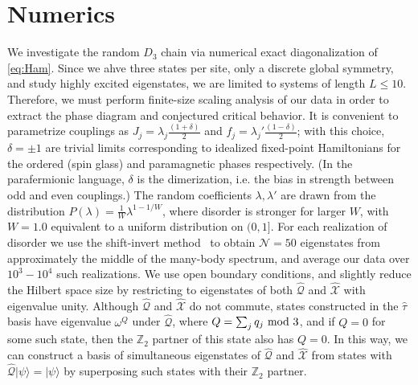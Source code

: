 \documentclass[prb,aps, twocolumn, superscriptaddress]{revtex4-1}
\def\ket#1{{|#1\rangle}}
\begin{document}
\section{Numerics} We investigate the random $D_3$ chain via numerical exact diagonalization of \eqref{eq:Ham}. Since we ahve three states per site, only a discrete global symmetry, and study highly excited eigenstates, we are limited to systems of length $L\leq 10$. Therefore, we must perform  finite-size scaling analysis of our data in order to extract the phase diagram and conjectured critical behavior.  It is convenient to parametrize couplings as $J_j = {\lambda_j}\frac{(1 + \delta)}{2}$ and $f_j = {\lambda_j'}\frac{(1 - \delta)}{2}$; with this choice, $\delta=\pm1$ are trivial limits corresponding to idealized fixed-point Hamiltonians for the ordered (spin glass) and paramagnetic phases respectively. (In the parafermionic language, $\delta$ is the dimerization, i.e. the bias in strength between odd and even couplings.) The random coefficients $\lambda,\lambda'$ are drawn from the distribution $P(\lambda) = \frac{1}{W} \lambda^{1-1/W}$, where disorder is stronger for larger $W$, with $W=1.0$ equivalent to a uniform distribution on $(0,1]$. For each realization of disorder we use the shift-invert {method~\cite{Luitz}} to obtain $\mathcal{N}=50$ eigenstates from approximately the middle of the many-body spectrum, and average our data over $10^3 -10^4$ such realizations. We use open boundary conditions, and slightly reduce the Hilbert space size by restricting to eigenstates of both ${\hat{\mathcal{Q}}}$ and ${\hat{\mathcal{X}}}$ with eigenvalue unity. 
Although ${\hat{\mathcal{Q}}}$ and ${\hat{\mathcal{X}}}$  do not commute, states constructed in the $\hat{\tau}$ basis have eigenvalue $\omega^Q$ under ${\hat{\mathcal{Q}}}$, where $Q = \sum_j q_j ~ {\rm mod}~ 3$, and if $Q=0$ for some such state, then the $\mathbb{Z}_2$ partner of this state also has $Q=0$. In this way, we can construct a basis of simultaneous eigenstates of ${\hat{\mathcal{Q}}}$ and ${\hat{\mathcal{X}}}$ from states with ${\hat{\mathcal{Q}}} \ket{\psi} = \ket{\psi}$ by superposing such states with their $\mathbb{Z}_2$ partner.
\end{document}
